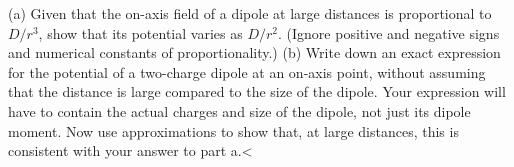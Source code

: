 (a) Given that the on-axis field of a dipole at large distances is proportional to
        $D/r^3$, show that its potential
        varies as $D/r^2$. (Ignore positive and negative signs and
        numerical constants of proportion\-ality.)\hwendpart
        (b) Write down an exact expression for the potential of a two-charge dipole at an on-axis point,
        without assuming that the distance is large compared to the size
        of the dipole. Your expression will have to contain the actual
        charges and size of the dipole, not just its dipole moment. Now
        use approximations to show that, at large distances, this is consistent with
        your answer to part a.<%
